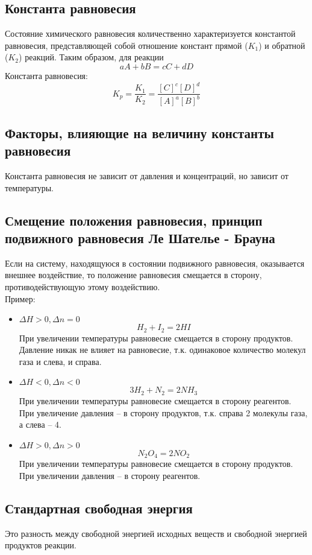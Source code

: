 \documentclass[14pt,a4paper]{scrartcl}
\begin{document}
	\subsection*{Константа равновесия}
	Состояние химического равновесия количественно характеризуется константой равновесия, представляющей собой отношение констант прямой ($K_1$) и обратной ($K_2$) реакций. Таким образом, для реакции
	$$ aA + bB = cC +  dD $$
	Константа равновесия:
	$$ K_p = \frac{K_1}{K_2} = \dfrac{\left[ C\right]^c \left[ D\right]^d }{\left[ A\right]^a \left[ B\right]^b} $$
	\subsection*{Факторы, влияющие на величину константы равновесия}
	Константа равновесия не зависит от давления и концентраций, но зависит от температуры.
	\subsection*{Смещение положения равновесия, принцип подвижного равновесия Ле Шателье - Брауна}
	Если на систему, находящуюся в состоянии подвижного равновесия, оказывается внешнее воздействие, то положение равновесия смещается в сторону, противодействующую этому воздействию. \\
	Пример: \\
	\begin{itemize}
		\item $ \Delta{H} > 0, \Delta{n} = 0 $ 
		$$ H_2 + I_2 = 2HI $$
		При увеличении температуры равновесие смещается в сторону продуктов. \\
		Давление никак не влияет на равновесие, т.к. одинаковое количество молекул газа и слева, и справа.
		\item $ \Delta{H} < 0, \Delta{n} < 0 $
		$$ 3H_2 + N_2 = 2 NH_3  $$
		При увеличении температуры равновесие смещается в сторону реагентов. \\
		При увеличение давления -- в сторону продуктов, т.к. справа 2 молекулы газа, а слева -- 4.
		\item $ \Delta{H} > 0, \Delta{n} > 0 $
		$$ N_2O_4 = 2NO_2 $$
		При увеличении температуры равновесие смещается в сторону продуктов. \\
		При увеличении давления -- в сторону реагентов.  	
	\end{itemize}
	
	\subsection*{Стандартная свободная энергия}
	Это разность между свободной энергией исходных веществ и свободной энергией продуктов реакции.
	
\end{document}
